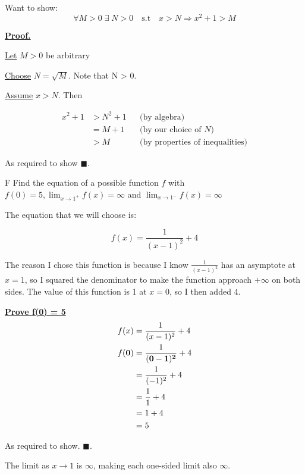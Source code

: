 \documentclass[]{article}
\begin{document}
Want to show: 
\[
    \forall M > 0\;\exists\; N >0 \quad \text{s.t} \quad 
    x > N \Longrightarrow x^2+1 > M
\]

\underline{\bf{Proof.}}

\underline{Let} $M > 0$ be arbitrary

\medbreak

\underline{Choose} $N = \sqrt{M} $. Note that N > 0.

\medbreak

\underline{Assume} $x > N$. Then


\begin{align*}
    x^2+1  & > N^2 + 1
        && \text{(by algebra)} \\[6pt]
    &= M+1 
        && \text{(by our choice of $N$)} \\[6pt]
    & > M
        && \text{(by properties of inequalities)} 
\end{align*}

As required to show $\blacksquare$.

\begin{question}{F}
    Find the equation of a possible function $f$ with $f(0) = 5, \displaystyle{\lim_{x\to1^+}} f(x) = \infty$ and $\displaystyle{\lim_{x\to1^-}} f(x) = \infty$
\end{question}

The equation that we will choose is:

\[
    f(x) = \frac{1}{(x-1)^2} + 4
\]

The reason I chose this function is because I know $\frac{1}{(x-1)^2}$ has an asymptote at $x = 1$, so I squared the denominator to make the function approach $+\infty$ on both sides.
The value of this function is 1 at $x=0$, so I then added $4$.

\medbreak 

\textbf{\underline{Prove f(0) = 5}}
\begin{align*}
    f(x) &= \frac{1}{(x-1)^2} + 4 \\
    f(\bf{0}) &= \frac{1}{(\bf{0}-1)^2} + 4 \\
    &= \frac{1}{(-1)^2} + 4 \\
    &= \frac{1}{1} + 4 \\
    &= 1 + 4\\
    &= 5 
\end{align*}

As required to show. $\blacksquare$.

\medbreak

The limit as $x \rightarrow 1$ is $\infty$, making each one-sided limit also $\infty$.
\end{document}
